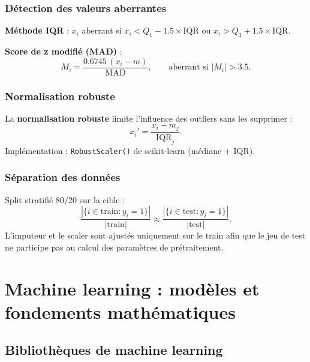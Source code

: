 \documentclass[12pt,a4paper]{report}
\newcommand{\abs}[1]{\lvert #1 \rvert}
\begin{document}
\subsubsection{Détection des valeurs aberrantes}

\textbf{Méthode IQR} : $x_i$ aberrant si $x_i < Q_1 - 1.5\times\text{IQR}$ ou
$x_i > Q_3 + 1.5\times\text{IQR}$.

\textbf{Score de z modifié (MAD)} :
\begin{equation}
 M_i = \frac{0.6745\,(x_i - m)}{\text{MAD}},
 \qquad \text{aberrant si } \abs{M_i} > 3.5.
\end{equation}

\subsubsection{Normalisation robuste}

La \textbf{normalisation robuste} limite l'influence des outliers sans les supprimer :
\begin{equation}
 x_i' = \frac{x_i - m_j}{\text{IQR}_j}.
\end{equation}
Implémentation : \texttt{RobustScaler()} de scikit-learn (médiane + IQR).

\subsubsection{Séparation des données}

Split stratifié 80/20 sur la cible :
\begin{equation}
 \frac{|\{i \in \text{train} : y_i = 1\}|}{|\text{train}|}
 \approx
 \frac{|\{i \in \text{test} : y_i = 1\}|}{|\text{test}|}.
\end{equation}
L'imputeur et le scaler sont ajustés uniquement sur le
train afin que le jeu de test ne participe pas au calcul des paramètres de prétraitement.

\section{Machine learning : modèles et fondements mathématiques}

\subsection{Bibliothèques de machine learning}
\end{document}

